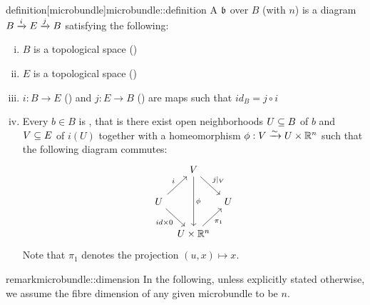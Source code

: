 \begin{mystatement}{definition}[microbundle]{microbundle::definition}
    A  $\bb$ over $B$ (with  $n$)
    is a diagram $\bundle{B}{E}{i}{j}$ satisfying the following:
    \begin{enumerate}[(i)]
        \item $B$ is a topological space ()
        \item $E$ is a topological space ()
        \item $i: B \to E$ () and $j: E \to B$ ()
        are maps such that $id_B = j \circ i$
        \item Every $b \in B$ is ,
        that is there exist open neighborhoods $U \sub B$ of $b$ and $V \sub E$ of $i(U)$
        together with a homeomorphism $\phi: V \isomto U \cross \R^n$ such that the following diagram commutes:
        \[
            \begin{tikzcd}[column sep=tiny]
                & V \ar[dr, "j\vert_V"] \ar[dd, "\phi"] & \\
                U \ar[ur, "i"] \ar[dr, "{id \cross 0}"'] & & U \\
                & U \cross\R^n \ar[ur, "\pi_1"'] &
            \end{tikzcd}
        \]
        Note that $\pi_1$ denotes the projection $(u, x) \mapsto x$.
    \end{enumerate}
\end{mystatement}

\begin{mystatement}{remark}{microbundle::dimension}
    In the following, unless explicitly stated otherwise,
    we assume the fibre dimension of any given microbundle to be $n$.
\end{mystatement}